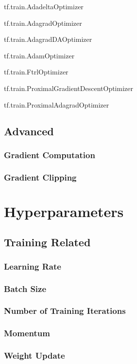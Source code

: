 tf.train.AdadeltaOptimizer

tf.train.AdagradOptimizer

tf.train.AdagradDAOptimizer

tf.train.AdamOptimizer

tf.train.FtrlOptimizer

tf.train.ProximalGradientDescentOptimizer

tf.train.ProximalAdagradOptimizer

\subsection{Advanced}

\subsubsection{Gradient Computation}

\subsubsection{Gradient Clipping}


\section{Hyperparameters}

\subsection{Training Related}

\subsubsection{Learning Rate}

\subsubsection{Batch Size}

\subsubsection{Number of Training Iterations}

\subsubsection{Momentum}

\subsubsection{Weight Update}

